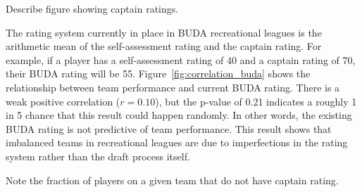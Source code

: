 Describe figure showing captain ratings.

The rating system currently in place in BUDA recreational leagues is the arithmetic mean of the self-assessment rating and the captain rating.  For example, if a player has a self-assessment rating of 40 and a captain rating of 70, their BUDA rating will be 55. Figure~\ref{fig:correlation_buda} shows the relationship between team performance and current BUDA rating. There is a weak positive correlation ($r = 0.10$), but the p-value of 0.21 indicates a roughly 1 in 5 chance that this result could happen randomly.  In other words, the existing BUDA rating is not predictive of team performance. This result shows that imbalanced teams in recreational leagues are due to imperfections in the rating system rather than the draft process itself.

Note the fraction of players on a given team that do not have captain rating.
